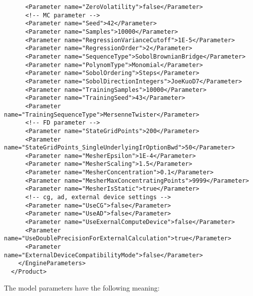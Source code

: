 \begin{verbatim}
      <Parameter name="ZeroVolatility">false</Parameter>
      <!-- MC parameter -->
      <Parameter name="Seed">42</Parameter>
      <Parameter name="Samples">10000</Parameter>
      <Parameter name="RegressionVarianceCutoff">1E-5</Parameter>
      <Parameter name="RegressionOrder">2</Parameter>
      <Parameter name="SequenceType">SobolBrownianBridge</Parameter>
      <Parameter name="PolynomType">Monomial</Parameter>
      <Parameter name="SobolOrdering">Steps</Parameter>
      <Parameter name="SobolDirectionIntegers">JoeKuoD7</Parameter>
      <Parameter name="TrainingSamples">10000</Parameter>
      <Parameter name="TrainingSeed">43</Parameter>
      <Parameter name="TrainingSequenceType">MersenneTwister</Parameter>
      <!-- FD parameter -->
      <Parameter name="StateGridPoints">200</Parameter>
      <Parameter name="StateGridPoints_SingleUnderlyingIrOptionBwd">50</Parameter>
      <Parameter name="MesherEpsilon">1E-4</Parameter>
      <Parameter name="MesherScaling">1.5</Parameter>
      <Parameter name="MesherConcentration">0.1</Parameter>
      <Parameter name="MesherMaxConcentratingPoints">9999</Parameter>
      <Parameter name="MesherIsStatic">true</Parameter>
      <!-- cg, ad, external device settings -->
      <Parameter name="UseCG">false</Parameter>
      <Parameter name="UseAD">false</Parameter>
      <Parameter name="UseExernalComputeDevice">false</Parameter>
      <Parameter name="UseDoublePrecisionForExternalCalculation">true</Parameter>
      <Parameter name="ExternalDeviceCompatibilityMode">false</Parameter>
    </EngineParameters>
  </Product>
\end{verbatim}

The model parameters have the following meaning:

